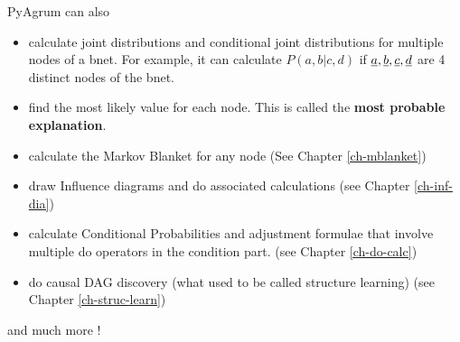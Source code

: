 PyAgrum can also  

\begin{itemize}
\item calculate joint distributions and conditional joint distributions for multiple nodes of a bnet.
For example, it can calculate  $P(a,b|c,d)$ if ${\underline{a}}, {\underline{b}}, {\underline{c}}, {\underline{d}}$ 
are 4  distinct nodes of the bnet.

\item find
the most likely value for each node. This is called the {\bf most probable explanation}.

\item calculate the Markov Blanket for any node (See Chapter \ref{ch-mblanket})

\item draw Influence diagrams and do associated calculations (see Chapter \ref{ch-inf-dia})

\item calculate Conditional Probabilities and adjustment formulae  that involve multiple do operators in the condition part. (see Chapter \ref{ch-do-calc})
\item do causal DAG discovery (what used to be called structure learning) (see Chapter \ref{ch-struc-learn})

\end{itemize}
and much more !

